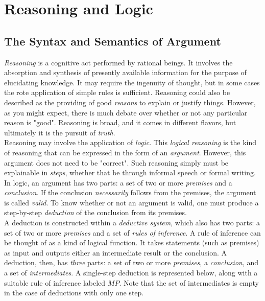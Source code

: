 \section{Reasoning and Logic}


\subsection{The Syntax and Semantics of Argument}

\textit{Reasoning} is a cognitive act performed by rational beings. It involves the absorption and synthesis of presently available information for the purpose of elucidating knowledge. It may require the ingenuity of thought, but in some cases the rote application of simple rules is sufficient. Reasoning could also be described as the providing of good \textit{reasons} to explain or justify things. However, as you might expect, there is much debate over whether or not any particular reason is "good". Reasoning is broad, and it comes in different flavors, but ultimately it is the pursuit of \textit{truth}. \\

Reasoning may involve the application of \textit{logic}. This \textit{logical reasoning} is the kind of reasoning that can be expressed in the form of an \textit{argument}. However, this argument does not need to be "correct". Such reasoning simply must be explainable in \textit{steps}, whether that be through informal speech or formal writing. \\

In logic, an argument has two parts: a set of two or more \textit{premises} and a \textit{conclusion}. If the conclusion \textit{necessarily} follows from the premises, the argument is called \textit{valid}. To know whether or not an argument is valid, one must produce a step-by-step \textit{deduction} of the conclusion from its premises. \\

A deduction is constructed within a \textit{deductive system}, which also has two parts: a set of two or more \textit{premises} and a set of \textit{rules of inference}. A rule of inference can be thought of as a kind of logical function. It takes statements (such as premises) as input and outputs either an intermediate result or the conclusion. A deduction, then, has \textit{three} parts: a set of two or more \textit{premises}, a \textit{conclusion}, and a set of \textit{intermediates}. A single-step deduction is represented below, along with a suitable rule of inference labeled $MP$. Note that the set of intermediates is empty in the case of deductions with only one step. \\[2mm]

